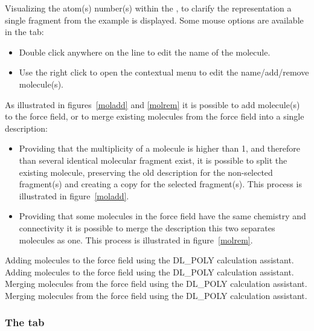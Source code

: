 {Visualizing the atom(s) number(s) within the , 
to clarify the representation a single fragment from the  example is displayed.}
\noindent Some mouse options are available in the  tab:
\begin{itemize} 
\item Double click anywhere on the line to edit the name of the molecule.
\item Use the right click to open the contextual menu to edit the name/add/remove molecule(s).
\end{itemize}
As illustrated in figures~\ref{moladd} and \ref{molrem} it is possible to add molecule(s) to the force field, 
or to merge existing molecules from the force field into a single description:
\begin{itemize}
\item Providing that the multiplicity of a molecule is higher than 1, and therefore than several identical molecular fragment exist, 
it is possible to split the existing molecule, preserving the old description for the non-selected fragment(s) and creating a copy for the selected fragment(s). 
This process is illustrated in figure~\ref{moladd}.
\item Providing that some molecules in the force field have the same chemistry and connectivity it is possible to merge the description 
this two separates molecules as one. 
This process is illustrated in figure~\ref{molrem}.
\end{itemize}
{Adding molecules to the force field using the DL\_POLY calculation assistant.}
{Adding molecules to the force field using the DL\_POLY calculation assistant.}
{Merging molecules from the force field using the DL\_POLY calculation assistant.}
{Merging molecules from the force field using the DL\_POLY calculation assistant.}

\clearpage

\subsubsection*{The  tab}


